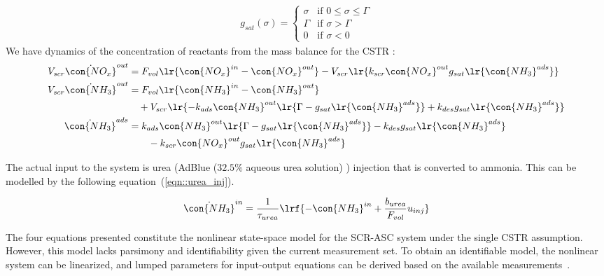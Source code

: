 \begin{align}
    g_{sat} (\sigma) = \begin{cases}
        \sigma & \text{if } 0 \leq \sigma \leq \Gamma \\
        \Gamma & \text{if } \sigma > \Gamma \\
        0 & \text{if } \sigma < 0
    \end{cases}
    \label{eqn::g_sat}
\end{align}
We have dynamics of the concentration of reactants from the mass balance for the CSTR \cite{hsieh2011development}:
\begin{align}
    V_{scr} \dot{\con{NO_x}}^{out} &= F_{vol} \lr{\con{NO_x}^{in}-\con{NO_x}^{out}} - V_{scr} \lr{k_{scr} \con{NO_x}^{out} g_{sat}\lr{\con{NH_3}^{ads}}} \label{eqn::nox_mass_bal}\\
    V_{scr} \dot{\con{NH_3}}^{out} &= F_{vol} \lr{\con{NH_3}^{in}-\con{NH_3}^{out}} \notag \\
    & \quad  + V_{scr}\lr{ - k_{ads} \con{NH_3}^{out} \lr{\Gamma - g_{sat}\lr{\con{NH_3}^{ads}}} + k_{des} g_{sat}\lr{{\con{NH_3}^{ads}}}} \label{eqn::nh3_mass_bal}
    \\
    \dot{\con{NH_3}}^{ads} &= k_{ads} \con{NH_3}^{out} \lr{\Gamma - g_{sat}\lr{\con{NH_3}^{ads}}}
                            - k_{des} g_{sat}\lr{{\con{NH_3}^{ads}}} \notag \\
                            & \qquad - k_{scr} \con{NO_x}^{out} g_{sat}\lr{\con{NH_3}^{ads}} \label{eqn::nh3_ads_mass_bal}
\end{align}

The actual input to the system is urea (AdBlue ($32.5\%$ aqueous urea solution) \cite{nova2014urea})
injection that is converted to ammonia. This can be modelled by the following equation~(\ref{eqn::urea_inj}).

\begin{equation}{\label{eqn::urea_inj}}
    \dot{\con{NH_3}}^{in} = \frac{1}{\tau_{urea}} \lrf{ - \con{NH_3}^{in} +   \frac{b_{urea}}{F_{vol}}  u_{inj}}
\end{equation}

The four equations presented constitute the nonlinear state-space model for the SCR-ASC system under the single CSTR
assumption. However, this model lacks parsimony and identifiability given the current measurement set. To obtain an
identifiable model, the nonlinear system can be linearized, and lumped parameters for input-output equations can be
derived based on the available measurements~\cite{charla2024reduced}.

